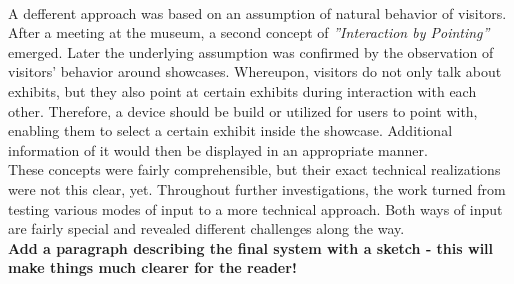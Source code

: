 \\
A defferent approach was based on an assumption of natural behavior of visitors. After a meeting at the museum, a second concept of \textit{''Interaction by Pointing''} emerged. Later the underlying assumption was confirmed by the observation of visitors' behavior around showcases. Whereupon, visitors do not only talk about exhibits, but they also point at certain exhibits during interaction with each other. Therefore, a device should be build or utilized for users to point with, enabling them to select a certain exhibit inside the showcase. Additional information of it would then be displayed in an appropriate manner. 
\\
These concepts were fairly comprehensible, but their exact technical realizations were not this clear, yet. Throughout further investigations, the work turned from testing various modes of input to a more technical approach. Both ways of input are fairly special and revealed different challenges along the way.
\\
\textbf{Add a paragraph describing the final system with a sketch - this will make things much clearer for the reader!}


